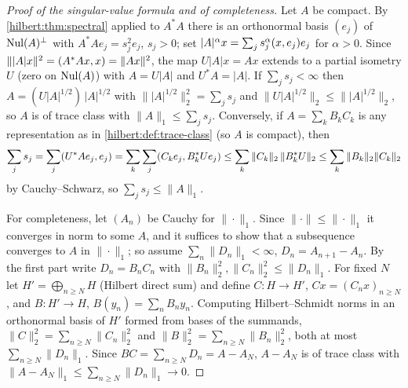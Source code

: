 \begin{proof}[Proof of the singular-value formula and of completeness]
Let $A$ be compact. By \cref{hilbert:thm:spectral} applied to $A^*A$ there is an orthonormal basis
$(e_j)$ of $\operatorname{Nul}(A)^\perp$ with $A^*Ae_j=s_j^2e_j$, $s_j>0$; set $|A|^{\alpha}x=\sum_js_j^{\alpha}( x, e_j)e_j$ for $\alpha>0$. Since $\||A|x\|^2=( A^*Ax, x)=\|Ax\|^2$, the map $U|A|x=Ax$ extends to a
partial isometry $U$ (zero on $\operatorname{Nul}(A)$) with $A=U|A|$ and $U^*A=|A|$. If $\sum_js_j<\infty$ then
$A=(U|A|^{1/2})\,|A|^{1/2}$ with $\||A|^{1/2}\|_2^2=\sum_js_j$ and $\|U|A|^{1/2}\|_2\le\||A|^{1/2}\|_2$,
so $A$ is of trace class with $\|A\|_1\le\sum_js_j$. Conversely, if $A=\sum_kB_kC_k$ is any
representation as in \cref{hilbert:def:trace-class} (so $A$ is compact), then
\begin{equation*}
\sum_js_j=\sum_j( U^*Ae_j, e_j)=\sum_k\sum_j( C_ke_j, B_k^*Ue_j)
\le\sum_k\|C_k\|_2\,\|B_k^*U\|_2\le\sum_k\|B_k\|_2\|C_k\|_2
\end{equation*}
by Cauchy--Schwarz, so $\sum_js_j\le\|A\|_1$.

For completeness, let $(A_n)$ be Cauchy for $\|\cdot\|_1$. Since $\|\cdot\|\le\|\cdot\|_1$ it
converges in norm to some $A$, and it suffices to show that a subsequence converges to $A$ in
$\|\cdot\|_1$; so assume $\sum_n\|D_n\|_1<\infty$, $D_n=A_{n+1}-A_n$. By the first part write
$D_n=B_nC_n$ with $\|B_n\|_2^2,\|C_n\|_2^2\le\|D_n\|_1$. For fixed $N$ let
$H'=\bigoplus_{n\ge N}H$ (Hilbert direct sum) and define $C:H\to H'$, $Cx=(C_nx)_{n\ge N}$, and
$B:H'\to H$, $B(y_n)=\sum_nB_ny_n$. Computing Hilbert--Schmidt norms in an orthonormal basis of $H'$
formed from bases of the summands, $\|C\|_2^2=\sum_{n\ge N}\|C_n\|_2^2$ and
$\|B\|_2^2=\sum_{n\ge N}\|B_n\|_2^2$, both at most $\sum_{n\ge N}\|D_n\|_1$. Since $BC=\sum_{n\ge N}D_n=A-A_N$,
$A-A_N$ is of trace class with $\|A-A_N\|_1\le\sum_{n\ge N}\|D_n\|_1\to0$.
\end{proof}

